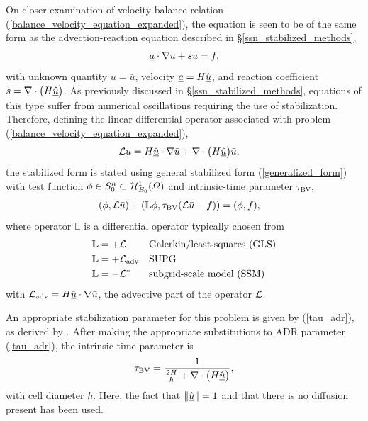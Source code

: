 On closer examination of velocity-balance relation (\ref{balance_velocity_equation_expanded}), the equation is seen to be of the same form as the advection-reaction equation described in \S \ref{ssn_stabilized_methods},
\begin{align*}
  \underline{a} \cdot \nabla u + s u = f,
\end{align*}
with unknown quantity $u = \bar{u}$, velocity $\underline{a} = H \hat{\underline{u}}$, and reaction coefficient $s = \nabla \cdot \big( H \underline{\hat{u}} \big)$.  As previously discussed in \S \ref{ssn_stabilized_methods}, equations of this type suffer from numerical oscillations requiring the use of stabilization.  Therefore, defining the linear differential operator associated with problem (\ref{balance_velocity_equation_expanded}),
\begin{align}
  \label{bv_linear_operator}
  \mathcal{L} u &= H \hat{\underline{u}} \cdot \nabla \bar{u} + \nabla \cdot \big( H \underline{\hat{u}} \big) \bar{u},
\end{align}
the stabilized form is stated using general stabilized form (\ref{generalized_form}) with test function $\phi \in S_0^h \subset \mathcal{H}_{E_0}^1(\varOmega)$ and intrinsic-time parameter  $\tau_{\text{BV}}$,
\begin{align}
  \label{bv_generalized_form}
  (\phi, \mathcal{L} \bar{u}) + (\mathbb{L} \phi, \tau_{\text{BV}}(\mathcal{L}\bar{u} - f)) &= (\phi, f),
\end{align}
where operator $\mathbb{L}$ is a differential operator typically chosen from
\begin{align}
  \label{bv_gls_operator}
  \mathbb{L} &= + \mathcal{L} && \text{Galerkin/least-squares (GLS)} \\
  \label{bv_supg_operator}
  \mathbb{L} &= + \mathcal{L}_{\text{adv}} && \text{SUPG} \\
  \label{bv_ssm_operator}
  \mathbb{L} &= - \mathcal{L}^* && \text{subgrid-scale model (SSM)}
\end{align}
with $\mathcal{L}_{\text{adv}} = H\hat{\underline{u}} \cdot \nabla \bar{u}$, the advective part of the operator $\mathcal{L}$.

An appropriate stabilization parameter for this problem is given by (\ref{tau_adr}), as derived by \citet{codina_1992}.  After making the appropriate substitutions to ADR parameter (\ref{tau_adr}), the intrinsic-time parameter is
\begin{align}
  \label{tau_bv}
  \tau_{\text{BV}} = \frac{1}{\frac{2 H}{h} + \nabla \cdot \big( H \hat{\underline{u}} \big)},
\end{align}
with cell diameter $h$.  Here, the fact that $\Vert \hat{\underline{u}} \Vert = 1$ and that there is no diffusion present has been used.


